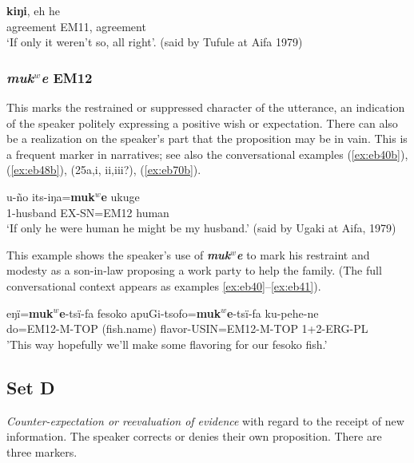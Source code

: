 \documentclass[output=paper]{langsci/langscibook}
\begin{document}
\begin{exe}
	\ex \label{ex:eb30}
	 \textbf{kiŋi}, {eh he}\\
	agreement EM11, agreement\\
	\trans ‘If only it weren’t so, all right’. (said by Tufule at Aifa 1979)
\end{exe}

\subsubsection{\textit{muk$^w$e} EM12} 
This marks the restrained or suppressed character of the utterance, an indication of the  speaker politely expressing a positive wish or expectation.  There can also be a realization on the speaker’s part that the proposition may be in vain.  This is a frequent marker in narratives; see also the conversational examples (\ref{ex:eb40b}), (\ref{ex:eb48b}), (25a,i, ii,iii?), (\ref{ex:eb70b}). %

\begin{exe}
	\ex \label{ex:eb31}
	\gll u-ño its-iŋa=\textbf{muk$^w$e} ukuge\\
	1-husband EX-SN=EM12 human\\
	\trans ‘If only he were human he might  be my husband.’ (said by Ugaki at Aifa, 1979)
\end{exe}

This example shows the speaker’s  use of \textbf{\textit{muk$^w$e}} to mark his restraint and modesty as a son-in-law proposing a work party to help the family. (The full conversational context appears as examples \ref{ex:eb40}--\ref{ex:eb41}).

\begin{exe}
	\ex \label{ex:eb32}
	\gll eŋï=\textbf{muk$^w$e}-tsï-fa fesoko apuGi-tsofo=\textbf{muk$^w$e}-tsï-fa ku-pehe-ne\\
	do=EM12-M-TOP (fish.name) flavor-USIN=EM12-M-TOP 1+2-ERG-PL\\
	\trans 'This way hopefully we’ll make some flavoring for our fesoko fish.'
\end{exe}

\subsection{Set D}

\emph{Counter-expectation or reevaluation of evidence} with regard to the receipt of new information.  The speaker corrects or denies their own proposition.  There are three markers.
\end{document}

